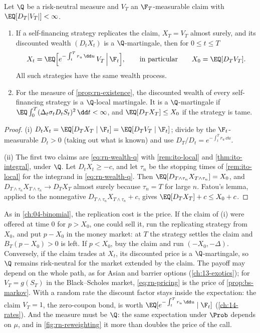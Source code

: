 \begin{theorem}\label{thm:rn-pricing}
Let $\Q$ be a risk-neutral measure and $V_T$ an $\F_T$-measurable claim with
$\EQ[D_T|V_T|]<\infty$.
\begin{enumerate}[label=(\roman*)]
  \item If a self-financing strategy replicates the claim, $X_T=V_T$ almost surely, and its
    discounted wealth $(D_tX_t)$ is a $\Q$-martingale, then for $0\le t\le T$
    \begin{equation}\label{eq:rn-pricing}
      X_t=\EQ\Big[e^{-\int_t^Tr_u\,\dd u}\,V_T\,\Big|\,\F_t\Big],
      \qquad\text{in particular}\qquad X_0=\EQ[D_TV_T].
    \end{equation}
    All such strategies have the same wealth process.
  \item For the measure of \cref{prop:rn-existence}, the discounted wealth of every
    self-financing strategy is a $\Q$-local martingale. It is a $\Q$-martingale if
    $\EQ\int_0^T(\Delta_t\sigma_tD_tS_t)^2\,\dd t<\infty$, and $\EQ[D_TX_T]\le X_0$ if the
    strategy is tame.
\end{enumerate}
\end{theorem}

\begin{proof}
(i) $D_tX_t=\EQ[D_TX_T\mid\F_t]=\EQ[D_TV_T\mid\F_t]$; divide by the $\F_t$-measurable
$D_t>0$ (taking out what is known) and use $D_T/D_t=e^{-\int_t^Tr_u\,\dd u}$.

(ii) The first two claims are \eqref{eq:rn-wealth-q} with \cref{rem:ito-local} and
\cref{thm:ito-integral}, under $\Q$. Let $D_tX_t\ge-c$, and let $\tau_n$ be the stopping times
of \cref{rem:ito-local} for the integrand in \eqref{eq:rn-wealth-q}. Then
$\EQ[D_{T\wedge\tau_n}X_{T\wedge\tau_n}]=X_0$, and $D_{T\wedge\tau_n}X_{T\wedge\tau_n}\to
D_TX_T$ almost surely because $\tau_n=T$ for large $n$. Fatou's lemma, applied to the
nonnegative $D_{T\wedge\tau_n}X_{T\wedge\tau_n}+c$, gives $\EQ[D_TX_T]+c\le X_0+c$.
\end{proof}

As in \cref{ch:04-binomial}, the replication cost is the price. If the claim of (i) were
offered at time $0$ for $p>X_0$, one could sell it, run the replicating strategy from $X_0$,
and put $p-X_0$ in the money market: at $T$ the strategy settles the claim and $B_T(p-X_0)>0$
is left. If $p<X_0$, buy the claim and run $(-X_0,-\Delta)$. Conversely, if the claim trades
at $X_t$, its discounted price is a $\Q$-martingale, so $\Q$ remains risk-neutral for the
market extended by the claim. The payoff may depend on the whole path, as for Asian and
barrier options (\cref{ch:13-exotics}); for $V_T=g(S_T)$ in the Black--Scholes market,
\eqref{eq:rn-pricing} is the price of \cref{prop:bs-markov}. With a random rate the discount
factor stays inside the expectation: the claim $V_T=1$, the zero-coupon bond, is worth
$\EQ[e^{-\int_t^Tr_u\,\dd u}\mid\F_t]$ (\cref{ch:14-rates}). And the measure must be $\Q$: the
same expectation under $\Prob$ depends on $\mu$, and in \cref{fig:rn-reweighting} it more than
doubles the price of the call.

